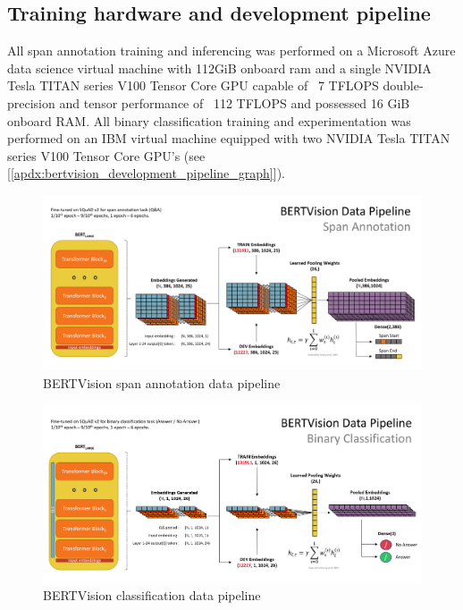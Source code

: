 \subsection{Training hardware and development pipeline}
\label{apdx:training_hardware}

All span annotation training and inferencing was performed on a Microsoft Azure data science virtual machine with 112GiB onboard ram and a single NVIDIA Tesla TITAN series V100 Tensor Core GPU capable of ~7 TFLOPS double-precision and tensor performance of ~112 TFLOPS and possessed 16 GiB onboard RAM.  All binary classification training and experimentation was performed on an IBM virtual machine equipped with two NVIDIA Tesla TITAN series V100 Tensor Core GPU's (see [\ref{apdx:bertvision_development_pipeline_graph}]).

\begin{figure}[t]
	\centering
	\includegraphics[width=\textwidth]{images/Data_Pipeline_Span_Annotation.png}%
	\caption{BERTVision span annotation data pipeline}
	\label{apdx:bertvision_span_annotation_data_pipeline_graph}
\end{figure}

\begin{figure}[!h]
	\centering
	\includegraphics[width=\textwidth]{images/Data_Pipeline_Binary_Classification.png}%
	\caption{BERTVision classification data pipeline}
	\label{apdx:bertvision_classification_data_pipeline_graph}
\end{figure}

